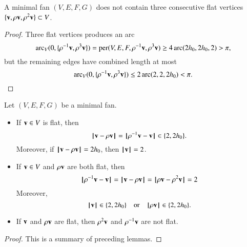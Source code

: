\begin{lemma}
A minimal fan $(V,E,F,G)$ does not contain three consecutive flat vertices $\{\v,\rho \v,\rho^2 \v\}\subset V$.
\end{lemma}

\begin{proof}  Three flat vertices produces an arc
$$
\arc_V(0,\{\rho^{-1} \v,\rho^3 \v\}) = \op{per}(V,E,F,\rho^{-1}\v,\rho^3 \v) \ge4\arc(2\hm,2\hm,2) > \pi,
$$
but the remaining edges  have combined length at most
$$
\arc_V(0,\{\rho^{-1} \v,\rho^3 \v\})\le 2\arc(2,2,2\hm) < \pi.
$$
\end{proof}

\begin{lemma}\guid{}
Let $(V,E,F,G)$ be a  minimal fan.
\begin{itemize} 
\item If $\v\in V$ is flat, then 
  $$\norm{\v}{\rho \v}=\norm{\rho^{-1}\v}{\v}\in \{2,2\hm\}.$$
  Moreover, if $\norm{\v}{\rho \v}=2\hm$, then $\normo{\v}=2$.
\item If $\v\in V$ and $\rho \v$ are both flat, then
$$
\norm{\rho^{-1}\v}{\v} = \norm{\v}{\rho \v} = \norm{\rho \v}{\rho^2 \v} = 2
$$
Moreover,
  $$
\normo{\v}\in \{2,2\hm\}\quad\text{or}\quad \normo{\rho \v}\in \{2,2\hm\}.
$$
\item If $\v$ and $\rho \v$ are flat, then $\rho^2 \v$ and $\rho^{-1}\v$ are not flat.
\end{itemize}
\end{lemma}

\begin{proof} This is a summary of preceding lemmas.
\end{proof}
%


